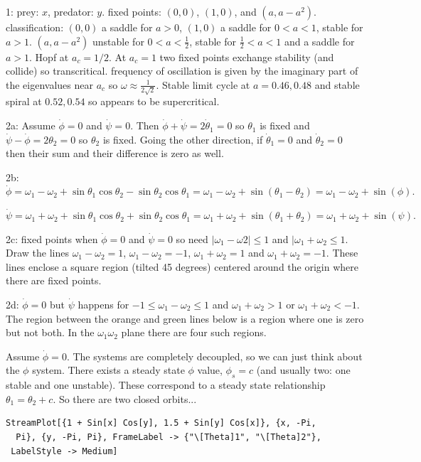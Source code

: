 \documentclass[12pt,letterpaper,noanswers]{exam}
\begin{document}
\eject

1: prey: $x$, predator: $y$.  fixed points: $(0,0)$, $(1,0)$, and $(a,a-a^2)$.  classification: $(0,0)$ a saddle for $a>0$, $(1,0)$ a saddle for $0<a<1$, stable for $a>1$.  $(a,a-a^2)$ unstable for $0<a<\frac{1}{2}$, stable for $\frac{1}{2}<a<1$ and a saddle for $a>1$.  Hopf at $a_c = 1/2$.   At $a_c = 1$ two fixed points exchange stability (and collide) so transcritical.  frequency of oscillation is given by the imaginary part of the eigenvalues near $a_c$ so $\omega \approx \frac{1}{2\sqrt{2}}$. Stable limit cycle at $a = 0.46, 0.48$ and stable spiral at $0.52,0.54$ so appears to be supercritical.


2a: Assume $\dot \phi = 0$ and $\dot \psi = 0$.  Then $\dot \phi + \dot \psi = 2\dot \theta_1 = 0$ so $\theta_1$ is fixed and $\dot \psi - \dot\phi = 2\theta_2 = 0$ so $\theta_2$ is fixed.  Going the other direction, if $\dot\theta_1 = 0$ and $\dot\theta_2=0$ then their sum and their difference is zero as well.

2b: $\dot\phi = \omega_1 - \omega_2 + \sin\theta_1\cos\theta_2 - \sin\theta_2\cos\theta_1 = \omega_1-\omega_2 + \sin(\theta_1 - \theta_2) = \omega_1-\omega_2 + \sin(\phi).$

$\dot\psi = \omega_1 + \omega_2 + \sin\theta_1\cos\theta_2 + \sin\theta_2\cos\theta_1 = \omega_1+\omega_2 + \sin(\theta_1 + \theta_2) = \omega_1+\omega_2 + \sin(\psi).$

2c: fixed points when $\dot \phi = 0$ and $\dot\psi = 0$ so need $\vert\omega_1 - \omega 2\vert\leq 1$ and $\vert \omega_1+\omega_2 \leq 1$.  Draw the lines $\omega_1 -\omega_2 = 1$, $\omega_1-\omega_2 = -1$, $\omega_1+\omega_2 = 1$ and $\omega_1+\omega_2 =-1$.  These lines enclose a square region (tilted 45 degrees) centered around the origin where there are fixed points.

2d: $\dot\phi = 0$ but $\dot\psi$ happens for $-1\leq \omega_1 - \omega_2 \leq 1$ and $\omega_1+\omega_2 >1$ or $\omega_1+\omega_2 < -1$.  The region between the orange and green lines below is a region where one is zero but not both.  In the $\omega_1\omega_2$ plane there are four such regions.

Assume $\dot\phi = 0$. The systems are completely decoupled, so we can just think about the $\phi$ system.  There exists a steady state $\phi$ value, $\phi_s = c$ (and usually two: one stable and one unstable).  These correspond to a steady state relationship $\theta_1 = \theta_2 + c$.  So there are two closed orbits...

\begin{verbatim}
StreamPlot[{1 + Sin[x] Cos[y], 1.5 + Sin[y] Cos[x]}, {x, -Pi, 
  Pi}, {y, -Pi, Pi}, FrameLabel -> {"\[Theta]1", "\[Theta]2"}, 
 LabelStyle -> Medium]
\end{verbatim}
\end{document}
